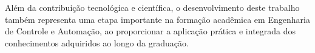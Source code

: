 Além da contribuição tecnológica e científica, o desenvolvimento deste trabalho também representa uma etapa importante na formação acadêmica em Engenharia de Controle e Automação, ao proporcionar a aplicação prática e integrada dos conhecimentos adquiridos ao longo da graduação.
